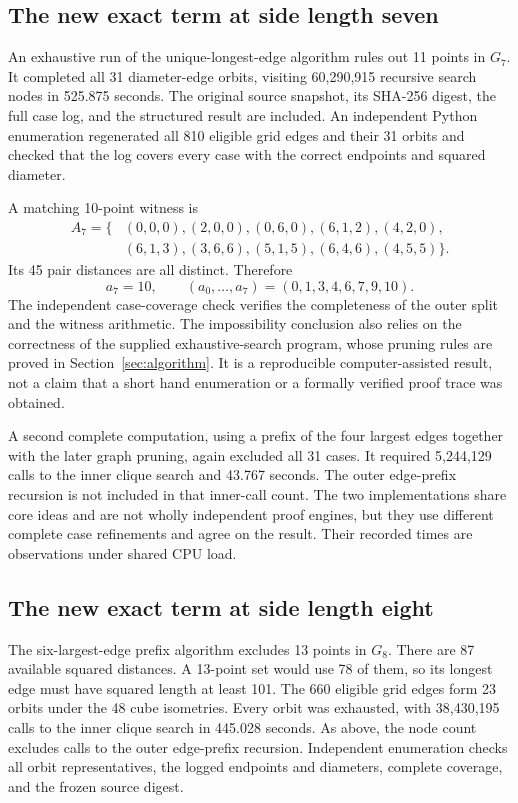 
\subsection{The new exact term at side length seven}
An exhaustive run of the unique-longest-edge algorithm rules out 11
points in \(G_7\). It completed all 31 diameter-edge orbits, visiting
60,290,915 recursive search nodes in 525.875 seconds. The original source
snapshot, its SHA-256 digest, the full case log, and the structured result
are included. An independent Python enumeration regenerated all 810
eligible grid edges and their 31 orbits and checked that the log covers
every case with the correct endpoints and squared diameter.

A matching 10-point witness is
\[
\begin{aligned}
A_7=\{&(0,0,0),(2,0,0),(0,6,0),(6,1,2),(4,2,0),\\
      &(6,1,3),(3,6,6),(5,1,5),(6,4,6),(4,5,5)\}.
\end{aligned}
\]
Its 45 pair distances are all distinct. Therefore
\[
\boxed{a_7=10},\qquad
(a_0,\ldots,a_7)=(0,1,3,4,6,7,9,10).
\]
The independent case-coverage check verifies the completeness of the
outer split and the witness arithmetic. The impossibility conclusion
also relies on the correctness of the supplied exhaustive-search
program, whose pruning rules are proved in Section~\ref{sec:algorithm}.
It is a reproducible computer-assisted result, not a claim that a short
hand enumeration or a formally verified proof trace was obtained.

A second complete computation, using a prefix of the four largest
edges together with the later graph pruning, again excluded all 31
cases. It required 5,244,129 calls to the inner clique search and
43.767 seconds. The outer edge-prefix recursion is not included in
that inner-call count. The two implementations share core ideas and
are not wholly independent proof engines, but they use different
complete case refinements and agree on the result. Their recorded
times are observations under shared CPU load.

\subsection{The new exact term at side length eight}
The six-largest-edge prefix algorithm excludes 13 points in \(G_8\).
There are 87 available squared distances. A 13-point set would use
78 of them, so its longest edge must have squared length at least 101.
The 660 eligible grid edges form 23 orbits under the 48 cube
isometries. Every orbit was exhausted, with 38,430,195 calls to the
inner clique search in 445.028 seconds. As above, the node count
excludes calls to the outer edge-prefix recursion. Independent
enumeration checks all orbit representatives, the logged endpoints
and diameters, complete coverage, and the frozen source digest.

